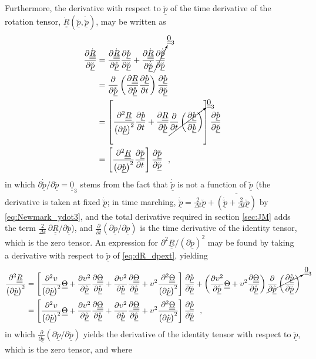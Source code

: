 \documentclass[12pt,a4paper,oneside,english]{abntex2} %
\newcommand{\fix}[1]{{\color{red}#1}}
\newcommand{\vect}[1]{\underline{#1}}
\newcommand{\del}[2]{\frac{\partial#1}{\partial#2}}
\def\tens#1{\underline{\underline{#1}}}
\def\lb{\left[}
\def\rb{\right]}
\def\lp{\left(}
\def\rp{\right)}
\def\zthree{\tens{0}_3}
\def\R{\tens{R}}
\def\Rdot{\dot{\R}}
\def\p{\vect{p}}
\def\dt{\Delta t}
\def\todt{\frac{2}{\dt}}
\def\pscaled{\mathring{\p}}
\def\pext{\breve{\p}}
\def\pextdot{\dot{\pext}}
\def\Th{\tens{\Theta}}
\def\dt{\Delta t}
\begin{document}
\begin{apendicesenv}
Furthermore, the derivative with respect to $\pext$ of the time derivative of the rotation tensor, $\Rdot\lp\pext,\pextdot\rp$, may be written as
\begin{align}
    \del{\Rdot}{\pext} &= \del{\Rdot}{\pscaled}\del{\pscaled}{\pext} + \del{\Rdot}{\pextdot}\cancelto{\zthree}{\del{\pextdot}{\pext}} 
    \nonumber \\
    &= \del{}{\pscaled}\lp\del{\R}{\pscaled}\del{\pscaled}{t}\rp\del{\pscaled}{\pext}  
    \nonumber \\
    &= \lb\frac{\partial^2\R}{\lp\partial\pscaled\rp^2}\del{\pscaled}{t}+\del{\R}{\pscaled}\cancelto{\zthree}{\del{}{t}\lp\del{\pscaled}{\pscaled}\rp}\rb\del{\pscaled}{\pext}
    \nonumber \\
    &= \lb\frac{\partial^2\R}{\lp\partial\pscaled\rp^2}\del{\pscaled}{t}\rb\del{\pscaled}{\pext} \ \ ,
    \label{eq:dRdot_dpext}
\end{align}
in which $\partial\pextdot/\partial\pext = \zthree$ stems from the fact that $\pextdot$ is not a function of $\pext$ \fix{(the derivative is taken at fixed $\pextdot$; in time marching, $\pextdot=\todt\pext+\overline{\lp\pextdot+\todt\pext\rp}$ by \cref{eq:Newmark_ydot3}, and the total derivative required in section \ref{sec:JM} adds the term $\todt\,\partial\R/\partial\pext$)}, and $\del{}{t}\lp\partial\pscaled/\partial\pscaled\rp$ is the time derivative of the identity tensor, which is the zero tensor. An expression for $\partial^2\R/\lp\partial\pscaled\rp^2$ may be found by taking a derivative with respect to $\pext$ of \cref{eq:dR_dpext}, yielding
\begin{align}
    \frac{\partial^2\R}{\lp\partial\pscaled\rp^2} &=  \lb\frac{\partial^2\upsilon}{\lp\partial\pscaled\rp^2}\Th + \del{\upsilon^2}{\pscaled}\del{\Th}{\pscaled} + \del{\upsilon^2}{\pscaled}\del{\Th}{\pscaled} + \upsilon^2\frac{\partial^2\Th}{\lp\partial\pscaled\rp^2}\rb\del{\pscaled}{\pext} + \lp\del{\upsilon^2}{\pscaled}\Th+\upsilon^2\del{\Th}{\pscaled}\rp \cancelto{\zthree}{\del{}{\pscaled}\lp\del{\pscaled}{\pext}\rp}
    \nonumber \\
    &=  \lb\frac{\partial^2\upsilon}{\lp\partial\pscaled\rp^2}\Th + \del{\upsilon^2}{\pscaled}\del{\Th}{\pscaled} + \del{\upsilon^2}{\pscaled}\del{\Th}{\pscaled} + \upsilon^2\frac{\partial^2\Th}{\lp\partial\pscaled\rp^2}\rb\del{\pscaled}{\pext} \ \ ,
    \label{eq:d2R_dpext2}
\end{align}
in which $\del{}{\pscaled}\lp\partial\pscaled/\partial\pext\rp$ yields the derivative of the identity tensor with respect to $\pext$, which is the zero tensor, and where

\end{apendicesenv}
\end{document}
